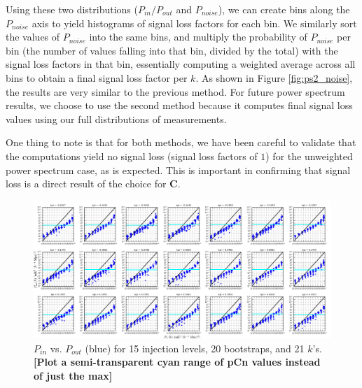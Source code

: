 \documentclass[preprint2,numberedappendix,tighten,twocolappendix]{aastex6}  %
\newcommand{\cc}[1]{{\color{purple} \textbf{[#1]}}}
\begin{document}
Using these two distributions ($P_{in}/P_{out}$ and $P_{noise}$), we can create bins along the $P_{noise}$ axis to yield histograms of signal loss factors for each bin. We similarly sort the values of $P_{noise}$ into the same bins, and multiply the probability of $P_{noise}$ per bin (the number of values falling into that bin, divided by the total) with the signal loss factors in that bin, essentially computing a weighted average across all bins to obtain a final signal loss factor per $k$. As shown in Figure \ref{fig:ps2_noise}, the results are very similar to the previous method. For future power spectrum results, we choose to use the second method because it computes final signal loss values using our full distributions of measurements.

One thing to note is that for both methods, we have been careful to validate that the computations yield no signal loss (signal loss factors of $1$) for the unweighted power spectrum case, as is expected. This is important in confirming that signal loss is a direct result of the choice for $\textbf{C}$.

\begin{figure}
	\centering
	\includegraphics[width=1.0\textwidth]{sigloss2_noise.png}
	\caption{$P_{in}$ vs. $P_{out}$ (blue) for 15 injection levels, 20 bootstraps, and 21 $k$'s. \cc{Plot a semi-transparent cyan range of pCn values instead of just the max}}
	\label{fig:sigloss2_noise}
\end{figure}
\end{document}
